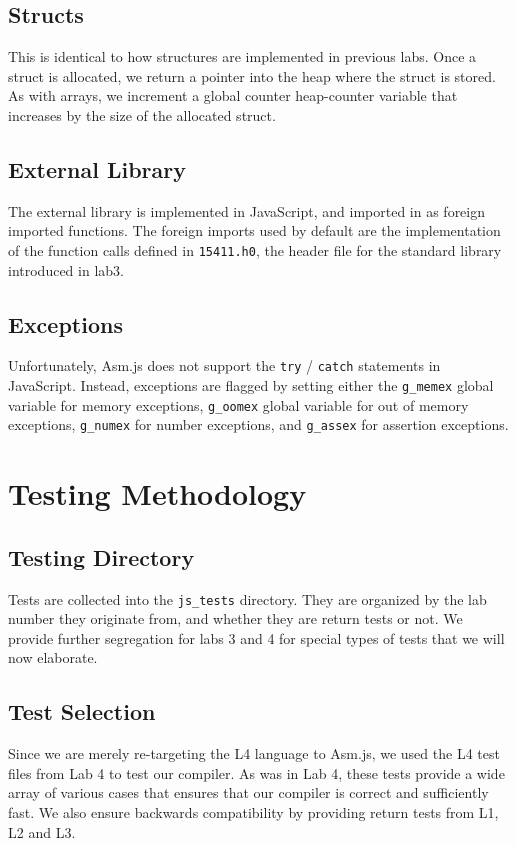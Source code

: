 \documentclass[twoside]{article}
\begin{document}
\begin{multicols}{2}
  \subsection{Structs}
    This is identical to how structures are implemented in previous labs. Once a struct
    is allocated, we return a pointer into the heap where the struct is stored. As with
    arrays, we increment a global counter heap-counter variable that increases by the 
    size of the allocated struct. 

  \subsection{External Library}
    The external library is implemented in JavaScript, and imported in as foreign
    imported functions. The foreign imports used by default are the implementation 
    of the function calls defined in \texttt{15411.h0}, the header file for the 
    standard library introduced in lab3. 

  \subsection{Exceptions}
    Unfortunately, Asm.js does not support the \texttt{try} / \texttt{catch}
    statements in JavaScript.
    Instead, exceptions are flagged by setting either the \texttt{g\_memex} global variable
    for memory exceptions, \texttt{g\_oomex} global variable for out of memory
    exceptions, \texttt{g\_numex} for number exceptions, and \texttt{g\_assex} for
    assertion exceptions.


\section{Testing Methodology}

\subsection{Testing Directory}
Tests are collected into the \texttt{js\_tests} directory. They are organized
by the lab number they originate from, and whether they are return tests or not. 
We provide further segregation for labs 3 and 4 for special types of tests that
we will now elaborate. 

\subsection{Test Selection}
Since we are merely re-targeting the L4 language to Asm.js, we used the L4 test
files from Lab 4 to test our compiler. As was in Lab 4, these tests provide a
wide array of various cases that ensures that our compiler is correct and
sufficiently fast. We also ensure backwards compatibility by providing return
tests from L1, L2 and L3. 


\end{multicols}
\end{document}
